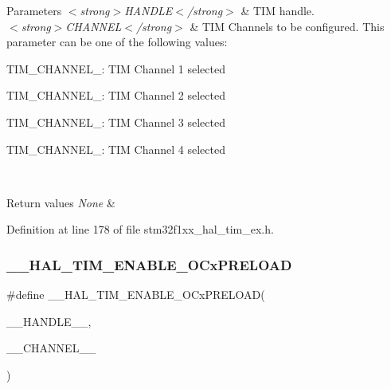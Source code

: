 \begin{DoxyParams}{Parameters}
{\em $<$strong$>$\+H\+A\+N\+D\+L\+E$<$/strong$>$} & T\+IM handle. \\
\hline
{\em $<$strong$>$\+C\+H\+A\+N\+N\+E\+L$<$/strong$>$} & T\+IM Channels to be configured. This parameter can be one of the following values\+: \begin{DoxyItemize}
\item T\+I\+M\+\_\+\+C\+H\+A\+N\+N\+E\+L\+\_\+: T\+IM Channel 1 selected \item T\+I\+M\+\_\+\+C\+H\+A\+N\+N\+E\+L\+\_\+: T\+IM Channel 2 selected \item T\+I\+M\+\_\+\+C\+H\+A\+N\+N\+E\+L\+\_\+: T\+IM Channel 3 selected \item T\+I\+M\+\_\+\+C\+H\+A\+N\+N\+E\+L\+\_\+: T\+IM Channel 4 selected \end{DoxyItemize}
\\
\hline
\end{DoxyParams}

\begin{DoxyRetVals}{Return values}
{\em None} & \\
\hline
\end{DoxyRetVals}


Definition at line 178 of file stm32f1xx\+\_\+hal\+\_\+tim\+\_\+ex.\+h.

\mbox{\label{group___t_i_m_ex_ga199e848f0a301987a500faea0db2dd70}} 
\subsubsection{\texorpdfstring{\+\_\+\+\_\+\+H\+A\+L\+\_\+\+T\+I\+M\+\_\+\+E\+N\+A\+B\+L\+E\+\_\+\+O\+Cx\+P\+R\+E\+L\+O\+AD}{\_\_HAL\_TIM\_ENABLE\_OCxPRELOAD}}
{\footnotesize\ttfamily \#define \+\_\+\+\_\+\+H\+A\+L\+\_\+\+T\+I\+M\+\_\+\+E\+N\+A\+B\+L\+E\+\_\+\+O\+Cx\+P\+R\+E\+L\+O\+AD(\begin{DoxyParamCaption}\item[{}]{\+\_\+\+\_\+\+H\+A\+N\+D\+L\+E\+\_\+\+\_\+,  }\item[{}]{\+\_\+\+\_\+\+C\+H\+A\+N\+N\+E\+L\+\_\+\+\_\+ }\end{DoxyParamCaption})}

